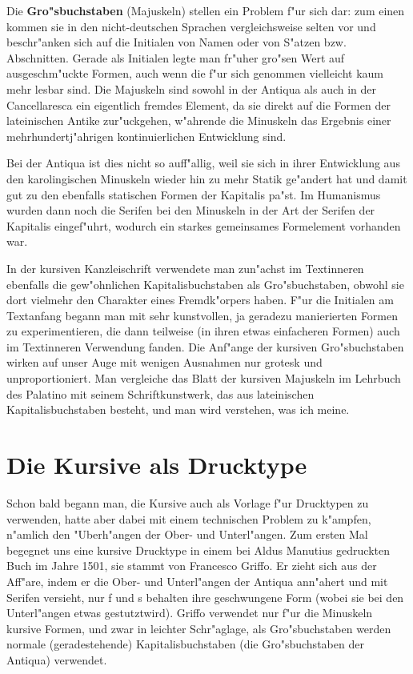 \documentclass[draft,12pt,a4paper,german]{article}
\begin{document}
Die \textbf{Gro"sbuchstaben} (Majuskeln) stellen ein Problem f"ur sich dar: zum
einen kommen sie in den nicht-deutschen Sprachen vergleichsweise selten vor
und beschr"anken sich auf die Initialen von Namen oder von S"atzen bzw.
Abschnitten. Gerade als Initialen legte man fr"uher gro"sen Wert auf
ausgeschm"uckte Formen, auch wenn die f"ur sich genommen vielleicht kaum mehr
lesbar sind. Die Majuskeln sind sowohl in der Antiqua als auch in der
Cancellaresca ein eigentlich fremdes Element, da sie direkt auf die Formen
der lateinischen Antike zur"uckgehen, w"ahrende die Minuskeln das Ergebnis
einer mehrhundertj"ahrigen kontinuierlichen Entwicklung sind.

Bei der Antiqua ist dies nicht so auff"allig, weil sie sich in ihrer
Entwicklung aus den karolingischen Minuskeln wieder hin zu mehr Statik
ge"andert hat und damit gut zu den ebenfalls statischen Formen der Kapitalis
pa"st. Im Humanismus wurden dann noch die Serifen bei den Minuskeln in der
Art der Serifen der Kapitalis eingef"uhrt, wodurch ein starkes gemeinsames
Formelement vorhanden war.

In der kursiven Kanzleischrift verwendete man zun"achst im Textinneren
ebenfalls die gew"ohnlichen Kapitalisbuchstaben als Gro"sbuchstaben, obwohl
sie dort vielmehr den Charakter eines Fremdk"orpers haben. F"ur die Initialen
am Textanfang begann man mit sehr kunstvollen, ja geradezu manierierten
Formen zu experimentieren, die dann teilweise (in ihren etwas einfacheren
Formen) auch im Textinneren Verwendung fanden. Die Anf"ange der kursiven
Gro"sbuchstaben wirken auf unser Auge mit wenigen Ausnahmen nur grotesk und
unproportioniert. Man vergleiche das Blatt der kursiven Majuskeln im
Lehrbuch des Palatino mit seinem Schriftkunstwerk, das aus lateinischen
Kapitalisbuchstaben besteht, und man wird verstehen, was ich meine.

\section{Die Kursive als Drucktype}

Schon bald begann man, die Kursive auch als Vorlage f"ur Drucktypen zu
verwenden, hatte aber dabei mit einem technischen Problem zu k"ampfen, n"amlich
den "Uberh"angen der Ober- und Unterl"angen. Zum ersten Mal begegnet uns eine
kursive Drucktype in einem bei Aldus Manutius gedruckten Buch im Jahre 1501,
sie stammt von Francesco Griffo. Er zieht sich aus der Aff"are, indem er die
Ober- und Unterl"angen der Antiqua ann"ahert und mit Serifen versieht, nur
f und s behalten ihre geschwungene Form (wobei sie bei den Unterl"angen etwas
\glqq gestutzt\grqq  wird). Griffo verwendet nur f"ur die Minuskeln kursive
Formen, und
zwar in leichter Schr"aglage, als Gro"sbuchstaben werden normale
(geradestehende)  Kapitalisbuchstaben (die Gro"sbuchstaben der Antiqua)
verwendet.
\end{document}
